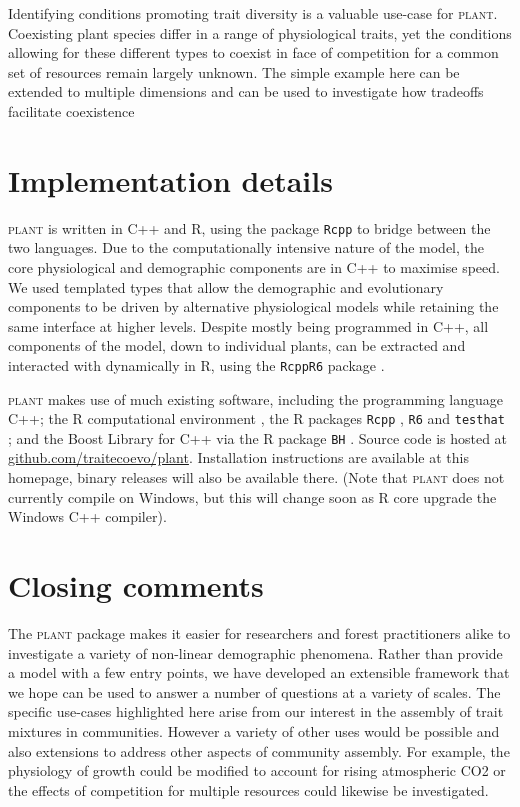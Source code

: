 \documentclass[a4paper,11pt]{article}
\newcommand{\plant}{\textsc{plant}}
\begin{document}
Identifying conditions promoting trait diversity is a valuable use-case
for {\plant}. Coexisting plant species differ in a range of physiological
traits, yet the conditions allowing for these different types to coexist
in face of competition for a common set of resources remain largely
unknown. The simple example here can be extended to multiple dimensions
and can be used to investigate how tradeoffs facilitate coexistence
\citep{Falster-2015}

\section{Implementation details}

{\plant} is written in C++ and R, using the package \texttt{Rcpp}
\citep{Eddelbuettel-2011, Eddelbuettel-2013} to bridge between the two
languages. Due to the computationally intensive nature of the model, the
core physiological and demographic components are in C++ to maximise
speed. We used templated types that allow the demographic and evolutionary
components to be driven by alternative physiological models while
retaining the same interface at higher levels. Despite mostly being
programmed in C++, all components of the model, down to individual
plants, can be extracted and interacted with dynamically in R, using the
\texttt{RcppR6} package \citep{RcppR6}.

{\plant} makes use of much existing software, including the programming
language C++; the R computational environment \citep{R-2015}, the R
packages \texttt{Rcpp} \citep{Eddelbuettel-2011, Eddelbuettel-2013},
\texttt{R6} \citep{Chang-2014} and \texttt{testhat}
\citep{Wickham-2011}; and the Boost Library for C++
\citep{Schaling-2014} via the R package \texttt{BH}
\citep{Eddelbuettel-2015}. Source code is hosted at
\href{https://github.com/traitecoevo/plant}{github.com/traitecoevo/plant}.
Installation instructions are available at this homepage, binary
releases will also be available there.  (Note that {\plant} does not
currently compile on Windows, but this will change soon as R core
upgrade the Windows C++ compiler).

\section{Closing comments}

The {\plant} package makes it easier for researchers and forest practitioners
alike to investigate a variety of non-linear demographic phenomena.  Rather
than provide a model with a few entry points, we have developed an extensible
framework that we hope can be used to answer a number of questions at a
variety of scales. The specific use-cases highlighted here arise from our
interest in the assembly of trait mixtures in communities. However a variety
of other uses would be possible and also extensions to address other aspects
of community assembly. For example,  the physiology of growth could be
modified to account for rising atmospheric CO2 or the effects of competition
for multiple resources could likewise be investigated.
\end{document}
